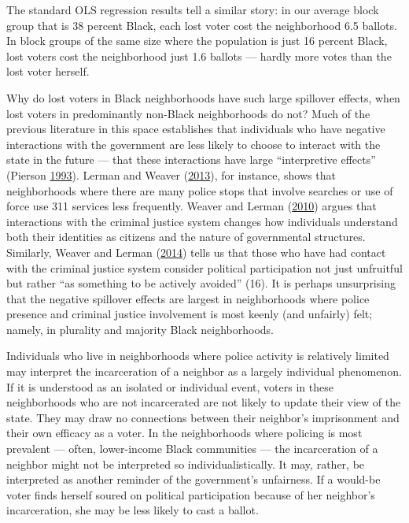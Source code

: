 \documentclass[12pt,]{article}
\begin{document}
The standard OLS regression results tell a similar story: in our average block group that is 38 percent Black, each lost voter cost the neighborhood 6.5 ballots. In block groups of the same size where the population is just 16 percent Black, lost voters cost the neighborhood just 1.6 ballots --- hardly more votes than the lost voter herself.

Why do lost voters in Black neighborhoods have such large spillover effects, when lost voters in predominantly non-Black neighborhoods do not? Much of the previous literature in this space establishes that individuals who have negative interactions with the government are less likely to choose to interact with the state in the future --- that these interactions have large ``interpretive effects'' (Pierson \protect\hyperlink{ref-Pierson1993}{1993}). Lerman and Weaver (\protect\hyperlink{ref-Lerman2013}{2013}), for instance, shows that neighborhoods where there are many police stops that involve searches or use of force use 311 services less frequently. Weaver and Lerman (\protect\hyperlink{ref-Weaver2010}{2010}) argues that interactions with the criminal justice system changes how individuals understand both their identities as citizens and the nature of governmental structures. Similarly, Weaver and Lerman (\protect\hyperlink{ref-Weaver2014}{2014}) tells us that those who have had contact with the criminal justice system consider political participation not just unfruitful but rather ``as something to be actively avoided'' (16). It is perhaps unsurprising that the negative spillover effects are largest in neighborhoods where police presence and criminal justice involvement is most keenly (and unfairly) felt; namely, in plurality and majority Black neighborhoods.

Individuals who live in neighborhoods where police activity is relatively limited may interpret the incarceration of a neighbor as a largely individual phenomenon. If it is understood as an isolated or individual event, voters in these neighborhoods who are not incarcerated are not likely to update their view of the state. They may draw no connections between their neighbor's imprisonment and their own efficacy as a voter. In the neighborhoods where policing is most prevalent --- often, lower-income Black communities --- the incarceration of a neighbor might not be interpreted so individualistically. It may, rather, be interpreted as another reminder of the government's unfairness. If a would-be voter finds herself soured on political participation because of her neighbor's incarceration, she may be less likely to cast a ballot.
\end{document}
